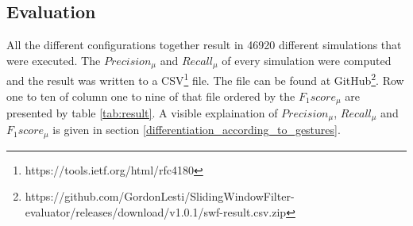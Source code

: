 \subsection{Evaluation} \label{evaluation}
All the different configurations together result in 46920 different simulations that were executed. The
$Precision_{\mu}$ and $Recall_{\mu}$ of every simulation were computed and the result was written to a
CSV\footnote{https://tools.ietf.org/html/rfc4180} file. The file can be found at
GitHub\footnote{https://github.com/GordonLesti/SlidingWindowFilter-evaluator/releases/download/v1.0.1/swf-result.csv.zip}.
Row one to ten of column one to nine of that file ordered by the $F_{1}score_{\mu}$ are presented by table
\ref{tab:result}. A visible explaination of $Precision_{\mu}$, $Recall_{\mu}$ and $F_{1}score_{\mu}$ is given in section
\ref{differentiation_according_to_gestures}.

